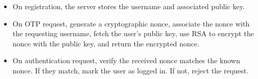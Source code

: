 \begin{itemize}

    \item On registration, the server stores the username and associated public key.

    \item On OTP request, generate a cryptographic nonce, associate the nonce with the requesting username, fetch the user's public key, use RSA to encrypt the nonce with the public key, and return the encrypted nonce.

    \item On authentication request, verify the received nonce matches the known nonce. If they match, mark the user as logged in. If not, reject the request.

\end{itemize}




